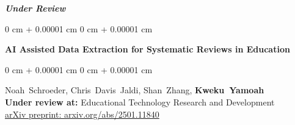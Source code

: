 \documentclass[10pt, letterpaper]{article}
\newenvironment{onecolentry}{
    \begin{adjustwidth}{
        0 cm + 0.00001 cm
    }{
        0 cm + 0.00001 cm
    }
}{
    \end{adjustwidth}
} %
\newenvironment{twocolentry}[2][]{
    \onecolentry
    \def\secondColumn{#2}
    \setcolumnwidth{\fill, 4.5 cm}
    \begin{paracol}{2}
}{
    \switchcolumn \raggedleft \secondColumn
    \end{paracol}
    \endonecolentry
} %
\begin{document}

        \vspace{0.50 cm}
        \large \textit{\textbf{Under Review}}
            \vspace{0.10 cm}
            \normalsize
            \begin{samepage}
                \begin{onecolentry}
                    \textbf{AI Assisted Data Extraction for Systematic Reviews in Education}
                \end{onecolentry}
                \vspace{0.10 cm}
                \begin{onecolentry}
                    \mbox{Noah Schroeder}, \mbox{Chris Davis Jaldi}, \mbox{Shan Zhang}, \mbox{\textbf{Kweku Yamoah}} \\
                    \vspace{0.10 cm}
                    \textbf{Under review at:} Educational Technology Research and Development \\
                    \href{https://arxiv.org/abs/2501.11840}{arXiv preprint: arxiv.org/abs/2501.11840}
                    \end{onecolentry}
        \end{samepage}
\end{document}
